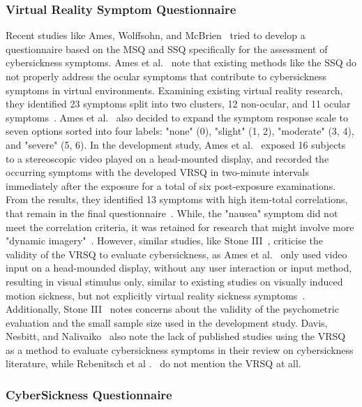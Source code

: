 \subsubsection{Virtual Reality Symptom Questionnaire}

Recent studies like Ames, Wolffsohn, and McBrien~\cite{Ames2005} tried to develop a questionnaire based on the MSQ
and SSQ specifically for the assessment of cybersickness symptoms.
Ames et al.~\cite{Ames2005} note that existing methods like the SSQ do not properly address the ocular symptoms that
contribute to cybersickness symptoms in virtual environments.
Examining existing virtual reality research, they identified 23 symptoms split into two clusters, 12 non-ocular, and
11 ocular symptoms~\cite{Ames2005}.
Ames et al.~\cite{Ames2005} also decided to expand the symptom response scale to seven options sorted into four
labels: "none" (0), "slight" (1, 2), "moderate" (3, 4), and "severe" (5, 6).
In the development study, Ames et al.~\cite{Ames2005} exposed 16 subjects to a stereoscopic video played on a
head-mounted display, and recorded the occurring symptoms with the developed VRSQ in two-minute
intervals immediately after the exposure for a total of six post-exposure examinations.
From the results, they identified 13 symptoms with high item-total correlations, that remain in the final
questionnaire~\cite{Ames2005}.
While, the "nausea" symptom did not meet the correlation criteria, it was retained for research that might involve
more "dynamic imagery"~\cite{Ames2005}.
However, similar studies, like Stone III~\cite{Stone2017}, criticise the validity of the VRSQ to evaluate
cybersickness, as Ames et al.~\cite{Ames2005} only used video input on a head-mounded display, without any user
interaction or input method, resulting in visual stimulus only, similar to existing studies on visually induced motion
sickness, but not explicitly virtual reality sickness symptoms~\cite{Stone2017}.
Additionally, Stone III~\cite{Stone2017} notes concerns about the validity of the psychometric evaluation and the
small sample size used in the development study.
Davis, Nesbitt, and Nalivaiko~\cite{Davis2014} also note the lack of published studies using the VRSQ as a method to
evaluate cybersickness symptoms in their review on cybersickness literature, while Rebenitsch et al
.~\cite{Rebenitsch2016} do not mention the VRSQ at all.

\subsubsection{CyberSickness Questionnaire}

